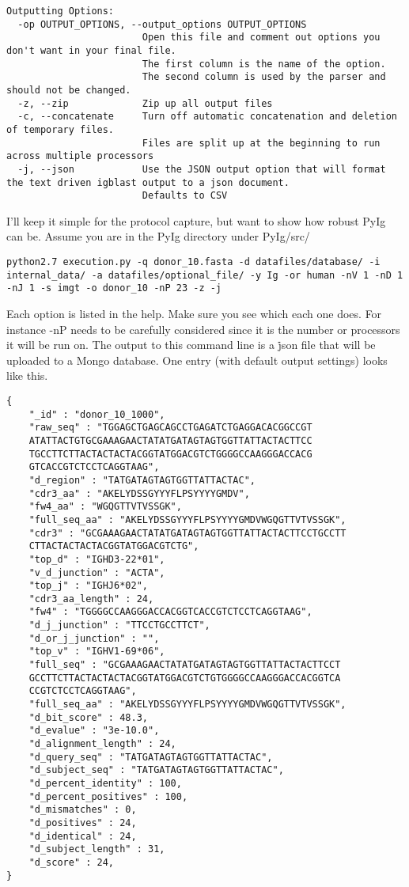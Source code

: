 \begin{lstlisting}[breaklines=true]
Outputting Options:
  -op OUTPUT_OPTIONS, --output_options OUTPUT_OPTIONS
                        Open this file and comment out options you don't want in your final file.
                        The first column is the name of the option.
                        The second column is used by the parser and should not be changed.
  -z, --zip             Zip up all output files
  -c, --concatenate     Turn off automatic concatenation and deletion of temporary files.
                        Files are split up at the beginning to run across multiple processors
  -j, --json            Use the JSON output option that will format the text driven igblast output to a json document.
                        Defaults to CSV
\end{lstlisting}


I'll keep it simple for the protocol capture, but want to show how robust PyIg can be. Assume you are in the PyIg directory under PyIg/src/

\begin{lstlisting}[breaklines=true]
python2.7 execution.py -q donor_10.fasta -d datafiles/database/ -i internal_data/ -a datafiles/optional_file/ -y Ig -or human -nV 1 -nD 1 -nJ 1 -s imgt -o donor_10 -nP 23 -z -j
\end{lstlisting}

Each option is listed in the help. Make sure you see which each one does. For instance -nP needs to be carefully considered since it is the number or processors it will be run on. The output to this command line is a \.json file that will be uploaded to a Mongo database. One entry (with default output settings) looks like this.

\begin{lstlisting}[breaklines=true]
{
    "_id" : "donor_10_1000",
    "raw_seq" : "TGGAGCTGAGCAGCCTGAGATCTGAGGACACGGCCGT
    ATATTACTGTGCGAAAGAACTATATGATAGTAGTGGTTATTACTACTTCC
    TGCCTTCTTACTACTACTACGGTATGGACGTCTGGGGCCAAGGGACCACG
    GTCACCGTCTCCTCAGGTAAG",
    "d_region" : "TATGATAGTAGTGGTTATTACTAC",
    "cdr3_aa" : "AKELYDSSGYYYFLPSYYYYGMDV",
    "fw4_aa" : "WGQGTTVTVSSGK",
    "full_seq_aa" : "AKELYDSSGYYYFLPSYYYYGMDVWGQGTTVTVSSGK",
    "cdr3" : "GCGAAAGAACTATATGATAGTAGTGGTTATTACTACTTCCTGCCTT
    CTTACTACTACTACGGTATGGACGTCTG",
    "top_d" : "IGHD3-22*01",
    "v_d_junction" : "ACTA",
    "top_j" : "IGHJ6*02",
    "cdr3_aa_length" : 24,
    "fw4" : "TGGGGCCAAGGGACCACGGTCACCGTCTCCTCAGGTAAG",
    "d_j_junction" : "TTCCTGCCTTCT",
    "d_or_j_junction" : "",
    "top_v" : "IGHV1-69*06",
    "full_seq" : "GCGAAAGAACTATATGATAGTAGTGGTTATTACTACTTCCT
    GCCTTCTTACTACTACTACGGTATGGACGTCTGTGGGGCCAAGGGACCACGGTCA
    CCGTCTCCTCAGGTAAG",
    "full_seq_aa" : "AKELYDSSGYYYFLPSYYYYGMDVWGQGTTVTVSSGK",
    "d_bit_score" : 48.3,
    "d_evalue" : "3e-10.0",
    "d_alignment_length" : 24,
    "d_query_seq" : "TATGATAGTAGTGGTTATTACTAC",
    "d_subject_seq" : "TATGATAGTAGTGGTTATTACTAC",
    "d_percent_identity" : 100,
    "d_percent_positives" : 100,
    "d_mismatches" : 0,
    "d_positives" : 24,
    "d_identical" : 24,
    "d_subject_length" : 31,
    "d_score" : 24,
}
\end{lstlisting}

